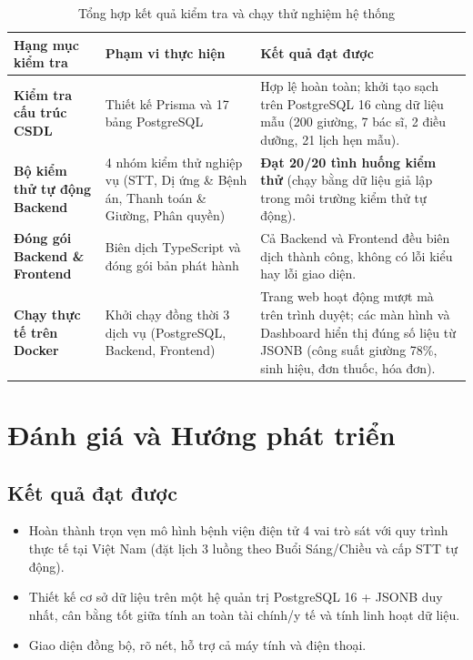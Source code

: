 \documentclass[12pt,a4paper]{report}
\begin{document}
\begin{table}[H]
  \centering
  \caption{Tổng hợp kết quả kiểm tra và chạy thử nghiệm hệ thống}
  \label{tab:verify-results}
  \begin{tabularx}{\textwidth}{@{}p{4.1cm} p{4.2cm} X@{}}
    \toprule
    \textbf{Hạng mục kiểm tra} & \textbf{Phạm vi thực hiện} & \textbf{Kết quả đạt được} \\
    \midrule
    \textbf{Kiểm tra cấu trúc CSDL} & Thiết kế Prisma và 17 bảng PostgreSQL & Hợp lệ hoàn toàn; khởi tạo sạch trên PostgreSQL 16 cùng dữ liệu mẫu (200 giường, 7 bác sĩ, 2 điều dưỡng, 21 lịch hẹn mẫu). \\
    \addlinespace
    \textbf{Bộ kiểm thử tự động Backend} & 4 nhóm kiểm thử nghiệp vụ (STT, Dị ứng \& Bệnh án, Thanh toán \& Giường, Phân quyền) & \textbf{Đạt 20/20 tình huống kiểm thử} (chạy bằng dữ liệu giả lập trong môi trường kiểm thử tự động). \\
    \addlinespace
    \textbf{Đóng gói Backend \& Frontend} & Biên dịch TypeScript và đóng gói bản phát hành & Cả Backend và Frontend đều biên dịch thành công, không có lỗi kiểu hay lỗi giao diện. \\
    \addlinespace
    \textbf{Chạy thực tế trên Docker} & Khởi chạy đồng thời 3 dịch vụ (PostgreSQL, Backend, Frontend) & Trang web hoạt động mượt mà trên trình duyệt; các màn hình và Dashboard hiển thị đúng số liệu từ JSONB (công suất giường 78\%, sinh hiệu, đơn thuốc, hóa đơn). \\
    \bottomrule
  \end{tabularx}
\end{table}

\section{Đánh giá và Hướng phát triển}

\subsection{Kết quả đạt được}
\begin{itemize}
  \item Hoàn thành trọn vẹn mô hình bệnh viện điện tử 4 vai trò sát với quy trình thực tế tại Việt Nam (đặt lịch 3 luồng theo Buổi Sáng/Chiều và cấp STT tự động).
  \item Thiết kế cơ sở dữ liệu trên một hệ quản trị PostgreSQL 16 + JSONB duy nhất, cân bằng tốt giữa tính an toàn tài chính/y tế và tính linh hoạt dữ liệu.
  \item Giao diện đồng bộ, rõ nét, hỗ trợ cả máy tính và điện thoại.
\end{itemize}
\end{document}
